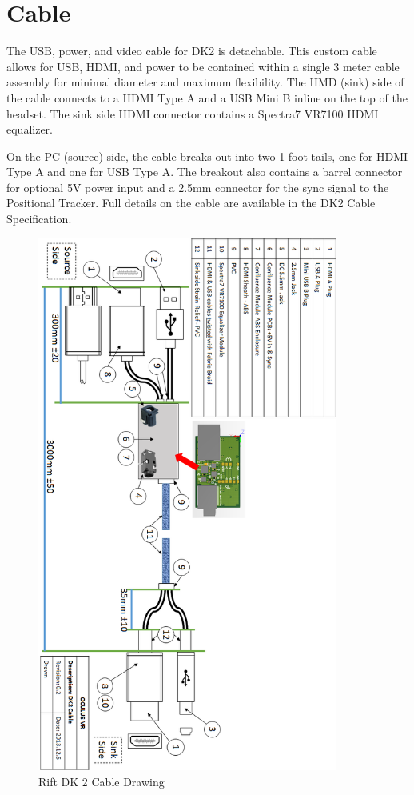 \documentclass[letterpaper]{article}
\begin{document}
\newpage

\section{Cable}
The USB, power, and video cable for DK2 is detachable.  This custom cable allows for USB, HDMI, and power to be contained within a single 3 meter cable assembly for minimal diameter and maximum flexibility.  The HMD (sink) side of the cable connects to a HDMI Type A and a USB Mini B inline on the top of the headset.  The sink side HDMI connector contains a Spectra7 VR7100 HDMI equalizer.

On the PC (source) side, the cable breaks out into two 1 foot tails, one for HDMI Type A and one for USB Type A.  The breakout also contains a barrel connector for optional 5V power input and a 2.5mm connector for the sync signal to the Positional Tracker.  Full details on the cable are available in the DK2 Cable Specification.

\newpage

\begin{figure}[H]  
  \centering
    \includegraphics[width=0.88\textwidth]{Figures/DK2_Cable_Drawing.png}
  \caption{Rift DK 2 Cable Drawing}
  \label{Cable_Diagram}
\end{figure}
\end{document}
